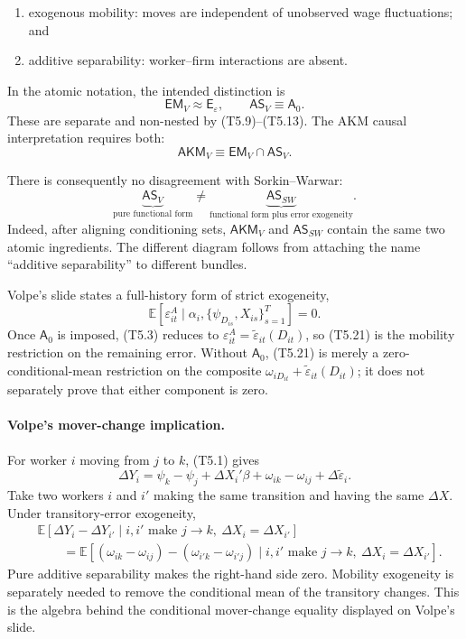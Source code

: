 \documentclass[11pt]{article}
\begin{document}
\begin{enumerate}
\item exogenous mobility: moves are independent of unobserved wage
  fluctuations; and
\item additive separability: worker--firm interactions are absent.
\end{enumerate}

In the atomic notation, the intended distinction is
\[
\mathsf{EM}_{V}\approx\mathsf E_\varepsilon,
\qquad
\mathsf{AS}_{V}\equiv\mathsf A_0.
\tag{T5.18}
\]
These are separate and non-nested by (T5.9)--(T5.13).  The AKM causal
interpretation requires both:
\[
\mathsf{AKM}_{V}
\equiv
\mathsf{EM}_{V}\cap\mathsf{AS}_{V}.
\tag{T5.19}
\]

There is consequently no disagreement with Sorkin--Warwar:
\[
\underbrace{\mathsf{AS}_{V}}_{\text{pure functional form}}
\neq
\underbrace{\mathsf{AS}_{SW}}_{\text{functional form plus error exogeneity}}.
\tag{T5.20}
\]
Indeed, after aligning conditioning sets,
\(\mathsf{AKM}_{V}\) and \(\mathsf{AS}_{SW}\) contain the same two atomic
ingredients.  The different diagram follows from attaching the name
``additive separability'' to different bundles.

Volpe's slide states a full-history form of strict exogeneity,
\[
\mathbb E[
\varepsilon^A_{it}
\mid
\alpha_i,\{\psi_{D_{is}},X_{is}\}_{s=1}^T
]
=0.
\tag{T5.21}
\]
Once \(\mathsf A_0\) is imposed, (T5.3) reduces to
\(\varepsilon^A_{it}=\widetilde\varepsilon_{it}(D_{it})\), so (T5.21) is the
mobility restriction on the remaining error.  Without \(\mathsf A_0\),
(T5.21) is merely a zero-conditional-mean restriction on the composite
\(\omega_{iD_{it}}+\widetilde\varepsilon_{it}(D_{it})\); it does not
separately prove that either component is zero.

\paragraph{Volpe's mover-change implication.}
For worker \(i\) moving from \(j\) to \(k\), (T5.1) gives
\[
\Delta Y_i
=
\psi_k-\psi_j+\Delta X_i'\beta
+\omega_{ik}-\omega_{ij}
+\Delta\widetilde\varepsilon_i.
\tag{T5.21a}
\]
Take two workers \(i\) and \(i'\) making the same transition and having the
same \(\Delta X\).  Under transitory-error exogeneity,
\[
\begin{aligned}
&\mathbb E[
\Delta Y_i-\Delta Y_{i'}
\mid
i,i'\text{ make }j\to k,\ \Delta X_i=\Delta X_{i'}]\\
&\qquad =
\mathbb E[
(\omega_{ik}-\omega_{ij})
-(\omega_{i'k}-\omega_{i'j})
\mid
i,i'\text{ make }j\to k,\ \Delta X_i=\Delta X_{i'}].
\end{aligned}
\tag{T5.21b}
\]
Pure additive separability makes the right-hand side zero.  Mobility
exogeneity is separately needed to remove the conditional mean of the
transitory changes.  This is the algebra behind the conditional
mover-change equality displayed on Volpe's slide.
\end{document}
